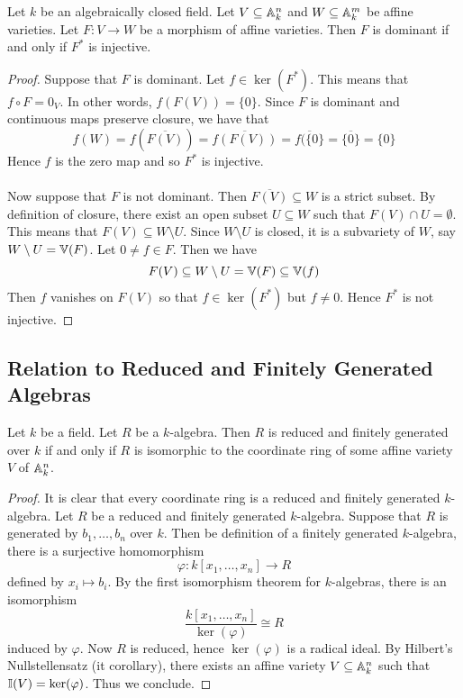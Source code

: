 \documentclass[a4paper]{article}
\begin{document}
\begin{lmm}{}{} Let $k$ be an algebraically closed field. Let $V\subseteq\mathbb{A}_k^n$ and $W\subseteq\mathbb{A}_k^m$ be affine varieties. Let $F:V\to W$ be a morphism of affine varieties. Then $F$ is dominant if and only if $F^\ast$ is injective. \tcbline
\begin{proof}
Suppose that $F$ is dominant. Let $f\in\ker(F^\ast)$. This means that $f\circ F=0_V$. In other words, $f(F(V))=\{0\}$. Since $F$ is dominant and continuous maps preserve closure, we have that $$f(W)=f(\overline{F(V)})=\overline{f(F(V))}=\overline{f(\{0\}}=\overline{\{0\}}=\{0\}$$ Hence $f$ is the zero map and so $F^\ast$ is injective. \\~\\

Now suppose that $F$ is not dominant. Then $\overline{F(V)}\subseteq W$ is a strict subset. By definition of closure, there exist an open subset $U\subseteq W$ such that $F(V)\cap U=\emptyset$. This means that $F(V)\subseteq W\setminus U$. Since $W\setminus U$ is closed, it is a subvariety of $W$, say $W\setminus U=\mathbb{V}(F)$. Let $0\neq f\in F$. Then we have $$F(V)\subseteq W\setminus U=\mathbb{V}(F)\subseteq\mathbb{V}(f)$$ Then $f$ vanishes on $F(V)$ so that $f\in\ker(F^\ast)$ but $f\neq 0$. Hence $F^\ast$ is not injective. 
\end{proof}
\end{lmm}

\subsection{Relation to Reduced and Finitely Generated Algebras}
\begin{prp}{}{} Let $k$ be a field. Let $R$ be a $k$-algebra. Then $R$ is reduced and finitely generated over $k$ if and only if $R$ is isomorphic to the coordinate ring of some affine variety $V$ of $\mathbb{A}_k^n$. \tcbline
\begin{proof}
It is clear that every coordinate ring is a reduced and finitely generated $k$-algebra. Let $R$ be a reduced and finitely generated $k$-algebra. Suppose that $R$ is generated by $b_1,\dots,b_n$ over $k$. Then be definition of a finitely generated $k$-algebra, there is a surjective homomorphism $$\varphi:k[x_1,\dots,x_n]\to R$$ defined by $x_i\mapsto b_i$. By the first isomorphism theorem for $k$-algebras, there is an isomorphism $$\frac{k[x_1,\dots,x_n]}{\ker(\varphi)}\cong R$$ induced by $\varphi$. Now $R$ is reduced, hence $\ker(\varphi)$ is a radical ideal. By Hilbert's Nullstellensatz (it corollary), there exists an affine variety $V\subseteq\mathbb{A}_k^n$ such that $\mathbb{I}(V)=\ker(\varphi)$. Thus we conclude. 
\end{proof}
\end{prp}
\end{document}
